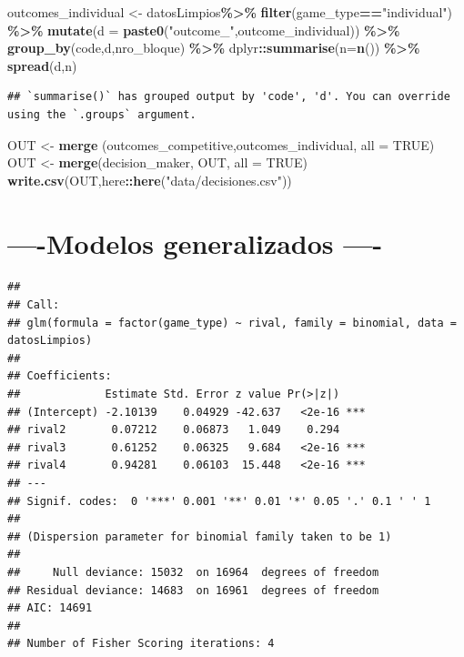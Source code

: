 \documentclass[
]{article}
\newenvironment{Shaded}{\begin{snugshade}}{\end{snugshade}}
\newcommand{\AttributeTok}[1]{\textcolor[rgb]{0.13,0.29,0.53}{#1}}
\newcommand{\ConstantTok}[1]{\textcolor[rgb]{0.56,0.35,0.01}{#1}}
\newcommand{\FunctionTok}[1]{\textcolor[rgb]{0.13,0.29,0.53}{\textbf{#1}}}
\newcommand{\NormalTok}[1]{#1}
\newcommand{\OtherTok}[1]{\textcolor[rgb]{0.56,0.35,0.01}{#1}}
\newcommand{\SpecialCharTok}[1]{\textcolor[rgb]{0.81,0.36,0.00}{\textbf{#1}}}
\newcommand{\StringTok}[1]{\textcolor[rgb]{0.31,0.60,0.02}{#1}}
\begin{document}
\begin{Shaded}
\begin{Highlighting}[]
\NormalTok{outcomes\_individual }\OtherTok{\textless{}{-}}\NormalTok{ datosLimpios}\SpecialCharTok{\%\textgreater{}\%} \FunctionTok{filter}\NormalTok{(game\_type}\SpecialCharTok{==}\StringTok{"individual"}\NormalTok{) }\SpecialCharTok{\%\textgreater{}\%} \FunctionTok{mutate}\NormalTok{(}\AttributeTok{d =} \FunctionTok{paste0}\NormalTok{(}\StringTok{"outcome\_"}\NormalTok{,outcome\_individual)) }\SpecialCharTok{\%\textgreater{}\%}  \FunctionTok{group\_by}\NormalTok{(code,d,nro\_bloque) }\SpecialCharTok{\%\textgreater{}\%}\NormalTok{ dplyr}\SpecialCharTok{::}\FunctionTok{summarise}\NormalTok{(}\AttributeTok{n=}\FunctionTok{n}\NormalTok{()) }\SpecialCharTok{\%\textgreater{}\%} \FunctionTok{spread}\NormalTok{(d,n)}
\end{Highlighting}
\end{Shaded}

\begin{verbatim}
## `summarise()` has grouped output by 'code', 'd'. You can override using the `.groups` argument.
\end{verbatim}

\begin{Shaded}
\begin{Highlighting}[]
\NormalTok{OUT }\OtherTok{\textless{}{-}} \FunctionTok{merge}\NormalTok{ (outcomes\_competitive,outcomes\_individual, }\AttributeTok{all =} \ConstantTok{TRUE}\NormalTok{)}
\NormalTok{OUT }\OtherTok{\textless{}{-}} \FunctionTok{merge}\NormalTok{(decision\_maker, OUT, }\AttributeTok{all =} \ConstantTok{TRUE}\NormalTok{)}
\FunctionTok{write.csv}\NormalTok{(OUT,here}\SpecialCharTok{::}\FunctionTok{here}\NormalTok{(}\StringTok{"data/decisiones.csv"}\NormalTok{))}
\end{Highlighting}
\end{Shaded}

\hypertarget{modelos-generalizados--}{%
\section{----Modelos generalizados ----}\label{modelos-generalizados--}}

\begin{verbatim}
## 
## Call:
## glm(formula = factor(game_type) ~ rival, family = binomial, data = datosLimpios)
## 
## Coefficients:
##             Estimate Std. Error z value Pr(>|z|)    
## (Intercept) -2.10139    0.04929 -42.637   <2e-16 ***
## rival2       0.07212    0.06873   1.049    0.294    
## rival3       0.61252    0.06325   9.684   <2e-16 ***
## rival4       0.94281    0.06103  15.448   <2e-16 ***
## ---
## Signif. codes:  0 '***' 0.001 '**' 0.01 '*' 0.05 '.' 0.1 ' ' 1
## 
## (Dispersion parameter for binomial family taken to be 1)
## 
##     Null deviance: 15032  on 16964  degrees of freedom
## Residual deviance: 14683  on 16961  degrees of freedom
## AIC: 14691
## 
## Number of Fisher Scoring iterations: 4
\end{verbatim}
\end{document}
